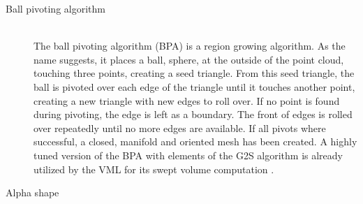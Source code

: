 \begin{description}
	\item[Ball pivoting algorithm] \hfill \\
	The ball pivoting algorithm (BPA) is a region growing algorithm.
	As the name suggests, it places a ball, \ie sphere, at the outside of the point cloud, touching three points, creating a seed triangle.
	From this seed triangle, the ball is pivoted over each edge of the triangle until it touches another point, creating a new triangle with new edges to roll over.
	If no point is found during pivoting, the edge is left as a boundary.
	The front of edges is rolled over repeatedly until no more edges are available.
	If all pivots where successful, a closed, manifold and oriented mesh has been created.
	A highly tuned version of the BPA with elements of the G2S algorithm is already utilized by the VML for its swept volume computation \cite{bpa_vml}.
	\item[Alpha shape]
	
\end{description}

